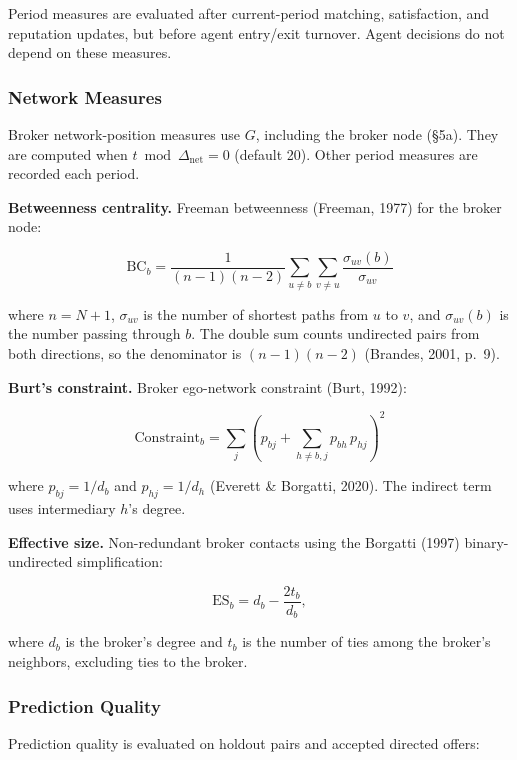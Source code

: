 \documentclass[11pt]{article}
\begin{document}
Period measures are evaluated after current-period matching, satisfaction, and reputation updates, but before agent entry/exit turnover. Agent decisions do not depend on these measures.

\subsubsection{Network Measures}\label{network-measures}

Broker network-position measures use \(G\), including the broker node (§5a). They are computed when \(t \bmod \Delta_{\mathrm{net}}=0\) (default 20). Other period measures are recorded each period.

\textbf{Betweenness centrality.} Freeman betweenness (Freeman, 1977) for the broker node:

\[\mathrm{BC}_b = \frac{1}{(n-1)(n-2)} \sum_{u \neq b} \sum_{v \neq u} \frac{\sigma_{uv}(b)}{\sigma_{uv}}\]

where \(n = N+1\), \(\sigma_{uv}\) is the number of shortest paths from \(u\) to \(v\), and \(\sigma_{uv}(b)\) is the number passing through \(b\). The double sum counts undirected pairs from both directions, so the denominator is \((n-1)(n-2)\) (Brandes, 2001, p.~9).

\textbf{Burt's constraint.} Broker ego-network constraint (Burt, 1992):

\[\mathrm{Constraint}_b = \sum_j \left(p_{bj} + \sum_{h \neq b,j}
p_{bh}\, p_{hj}\right)^2\]

where \(p_{bj} = 1/d_b\) and \(p_{hj} = 1/d_h\) (Everett \& Borgatti, 2020). The indirect term uses intermediary \(h\)'s degree.

\textbf{Effective size.} Non-redundant broker contacts using the Borgatti (1997) binary-undirected simplification:

\[\text{ES}_b = d_b - \frac{2t_b}{d_b},\]

where \(d_b\) is the broker's degree and \(t_b\) is the number of ties among the broker's neighbors, excluding ties to the broker.

\subsubsection{Prediction Quality}\label{prediction-quality}

Prediction quality is evaluated on holdout pairs and accepted directed offers:
\end{document}
